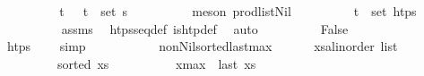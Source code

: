 \begin{isabellebody}
\ \ \ \ \ \ \isamarkupfalse%
\ \isamarkupfalse%
\ t\isactrlsub {\isasympi}\ {\isasympi}\ \ {\isachardoublequoteopen}{\isacharparenleft}{\kern0pt}t\isactrlsub {\isasympi}{\isacharcomma}{\kern0pt}{\isasympi}{\isacharparenright}{\kern0pt}\ {\isasymin}\ set\ {\isasympi}s{\isachardoublequoteclose}\isanewline
\ \ \ \ \ \ \ \ \isamarkupfalse%
\ {\isacharparenleft}{\kern0pt}meson\ prod{\isacharunderscore}{\kern0pt}list{\isacharunderscore}{\kern0pt}Nil{\isacharparenright}{\kern0pt}\isanewline
\ \ \ \ \ \ \isamarkupfalse%
\ \isamarkupfalse%
\ {\isachardoublequoteopen}t\isactrlsub {\isasympi}\ {\isasymin}\ set\ htps{\isachardoublequoteclose}\isanewline
\ \ \ \ \ \ \ \ \isamarkupfalse%
\ assms\ \isamarkupfalse%
\ htps{\isacharunderscore}{\kern0pt}seq{\isacharunderscore}{\kern0pt}def\ is{\isacharunderscore}{\kern0pt}htp{\isacharunderscore}{\kern0pt}def\ \isamarkupfalse%
\ auto\isanewline
\ \ \ \ \ \ \isamarkupfalse%
\ \isamarkupfalse%
\ {\isachardoublequoteopen}False{\isachardoublequoteclose}\isanewline
\ \ \ \ \ \ \ \ \isamarkupfalse%
\ {\isacartoucheopen}htps\ {\isacharequal}{\kern0pt}\ {\isacharbrackleft}{\kern0pt}{\isacharbrackright}{\kern0pt}{\isacartoucheclose}\ \isamarkupfalse%
\ simp\isanewline
\ \ \ \ \isamarkupfalse%
\isanewline
\ \ \isamarkupfalse%
%
\endisatagproof
{\isafoldproof}%
%
\isadelimproof
\isanewline
%
\endisadelimproof
\isanewline
\ \ \isamarkupfalse%
\ non{\isacharunderscore}{\kern0pt}Nil{\isacharunderscore}{\kern0pt}sorted{\isacharunderscore}{\kern0pt}last{\isacharunderscore}{\kern0pt}max{\isacharcolon}{\kern0pt}\ \isanewline
\ \ \ \ \ {\isachardoublequoteopen}{\isacharparenleft}{\kern0pt}xs{\isacharcolon}{\kern0pt}{\isacharcolon}{\kern0pt}{\isacharparenleft}{\kern0pt}{\isacharprime}{\kern0pt}a{\isacharcolon}{\kern0pt}{\isacharcolon}{\kern0pt}linorder{\isacharparenright}{\kern0pt}\ list{\isacharparenright}{\kern0pt}\ {\isasymnoteq}\ {\isacharbrackleft}{\kern0pt}{\isacharbrackright}{\kern0pt}{\isachardoublequoteclose}\ \isanewline
\ \ \ \ \ \ \ \ \ {\isachardoublequoteopen}sorted\ xs{\isachardoublequoteclose}\ \isanewline
\ \ \ \ \ \ \ \ \ {\isachardoublequoteopen}x\isactrlsub m\isactrlsub a\isactrlsub x\ {\isacharequal}{\kern0pt}\ last\ xs{\isachardoublequoteclose}\ \isanewline

\end{isabellebody}
